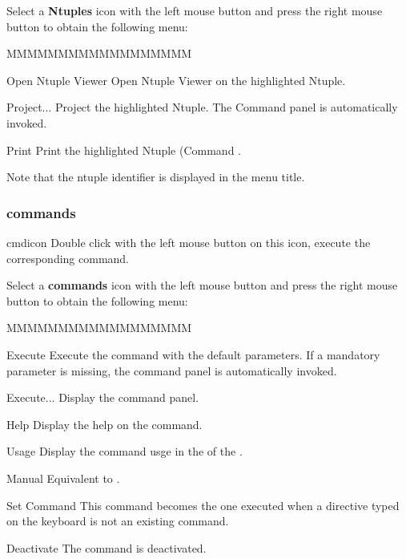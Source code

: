 Select a {\bf Ntuples} icon with the left mouse button and press
the right mouse button to obtain the following menu:


\begin{DLsf}{MMMMMMMMMMMMMMMMMM}
\item[Open Ntuple Viewer]    Open Ntuple Viewer on the highlighted Ntuple.
\item[Project...]            Project the highlighted Ntuple. The Command
                             panel  is automatically invoked.
\item[Print]                 Print the highlighted Ntuple (Command
                             .
\end{DLsf}

Note that the ntuple identifier is displayed in the menu title.


\subsubsection{\XPAW{} commands}
\begin{ICON}{cmdicon}
Double click with the left mouse button on this icon, execute the corresponding
\XPAW{} command.
\end{ICON}

Select a {\bf \XPAW{} commands} icon with the left mouse button and press
the right mouse button to obtain the following menu:


\begin{DLsf}{MMMMMMMMMMMMMMMMMM}
\item[Execute]      Execute the command with the default parameters. If
                    a mandatory parameter is missing, the command panel
                    is automatically invoked.
\item[Execute...]   Display the command panel.
\item[Help]         Display the help on the command.
\item[Usage]        Display the command usge in the \TP{} of the \EW.
\item[Manual]       Equivalent to .
\item[Set Command]  This command becomes the one executed when a directive
                    typed on the keyboard is not an existing \XPAW{} command.
\item[Deactivate]   The command is deactivated.
\end{DLsf}

